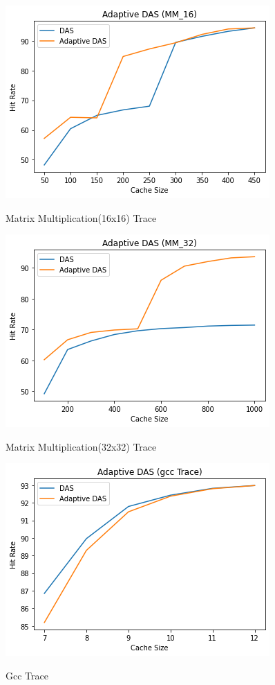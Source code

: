 \documentclass[conference]{IEEEtran}
\begin{document}
 \begin{figure}
        \centering
       \includegraphics[scale=0.6]{adaptive_mm16.png}~
       \caption{Matrix Multiplication(16x16) Trace}\label{Fig:1}
 \end{figure}

 \begin{figure}
        \centering
       \includegraphics[scale=0.6]{adaptive_mm32.png}~
       \caption{Matrix Multiplication(32x32) Trace}\label{Fig:1}
 \end{figure}

 \begin{figure}
        \centering
       \includegraphics[scale=0.6]{adpative_gcc.png}~
       \caption{Gcc Trace}\label{Fig:1}
 \end{figure}
\end{document}
